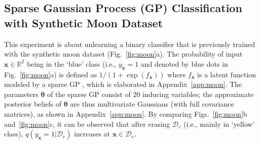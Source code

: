 \documentclass{article}
\theoremstyle{definition}
\newcommand{\mbf}[1]{\mathbf{#1}}
\newcommand{\mcl}[1]{\mathcal{#1}}
\newcommand{\mbb}[1]{\mathbb{#1}}
\newcommand{\da}{\mcl{D}}
\newcommand{\dc}{\mcl{D}_r}
\newcommand{\dr}{\mcl{D}_e}
\begin{document}
\subsection{Sparse Gaussian Process (GP) Classification with Synthetic Moon Dataset}
\label{subsec:expmoon}
%
This experiment is about unlearning a binary classifier that is previously trained with the synthetic moon dataset (Fig.~\ref{fig:moon}a). 
The probability of input $\mbf{x} \in \mbb{R}^2$ being in the `blue' class (i.e., $y_{\mbf{x}} = 1$ and denoted by blue dots in Fig.~\ref{fig:moon}a) is defined as $1/(1 + \exp(f_{\mbf{x}}))$ where $f_{\mbf{x}}$ is a latent function modeled by a sparse GP \cite{quinonero2005unifying}, which is elaborated in Appendix~\ref{app:moon}. 
The parameters $\bm{\theta}$ of the sparse GP consist of $20$ inducing variables;
 the approximate
posterior beliefs of $\bm{\theta}$ are thus 
multivariate Gaussians (with full covariance matrices), as shown in Appendix~\ref{app:moon}.
By comparing Figs.~\ref{fig:moon}b and~\ref{fig:moon}c, it can be observed that after erasing $\dr$ (i.e., mainly in `yellow' class), $q(y_{\mbf{x}} = 1|\dc)$ increases at $\mbf{x} \in \dr$.
%
%
\end{document}
